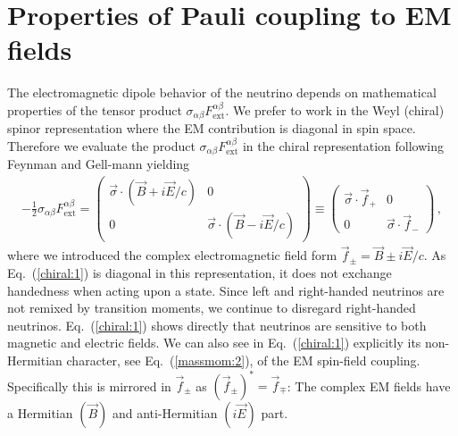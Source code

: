 \documentclass[addchapnum]{ws-rv961x669} %
\newcommand{\req}[1]{Eq.~(\ref{#1})}
\begin{document}
\section{Properties of Pauli coupling to EM fields}
\label{sec:numoment}
The electromagnetic dipole behavior of the neutrino depends on mathematical properties of the tensor product $\sigma_{\alpha\beta}F^{\alpha\beta}_\mathrm{ext}$. We prefer to work in the Weyl (chiral) spinor representation where the EM contribution is diagonal in spin space. Therefore we evaluate the product $\sigma_{\alpha\beta}F^{\alpha\beta}_\mathrm{ext}$ in the chiral representation following Feynman and Gell-mann\cite{Feynman:1958ty} yielding
\begin{align}
\label{chiral:1}
-\frac{1}{2}\sigma_{\alpha\beta}F^{\alpha\beta}_\mathrm{ext}=
\begin{pmatrix}
\vec{\sigma}\cdot(\vec{B}+i\vec{E}/c) & 0\\
0 & \vec{\sigma}\cdot(\vec{B}-i\vec{E}/c)
\end{pmatrix}\equiv
\begin{pmatrix}
\vec{\sigma}\cdot\vec{f}_{+} & 0 \\
0 & \vec{\sigma}\cdot\vec{f}_{-}
\end{pmatrix}\,,
\end{align}
where we introduced the complex electromagnetic field form $\vec{f}_{\pm}=\vec{B}\pm i\vec{E}/c$. As \req{chiral:1} is diagonal in this representation, it does not exchange handedness when acting upon a state. Since left and right-handed neutrinos are not remixed by transition moments, we continue to disregard right-handed neutrinos. \req{chiral:1} shows directly that neutrinos are sensitive to both magnetic and electric fields. We can also see in \req{chiral:1} explicitly its non-Hermitian character, see \req{massmom:2}, of the EM spin-field coupling. Specifically this is mirrored in $\vec{f}_{\pm}$ as $(\vec{f}_{\pm})^{*}=\vec{f}_{\mp}$: The complex EM fields have a Hermitian $(\vec{B})$ and anti-Hermitian $(i\vec{E})$ part.
\end{document}
